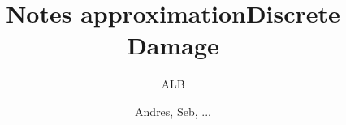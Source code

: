 \documentclass[]{article}
\title{Notes approximation}
\author{ALB}
\begin{document}



\title{Discrete Damage}


\author{Andres, Seb, ...}


\begin{abstract}

\end{abstract}


\end{document}
